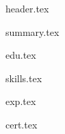 \documentclass[11pt, a4paper]{extarticle}
\begin{document}
	{header.tex}

	{summary.tex}

	{edu.tex}

	{skills.tex}

	{exp.tex}

	{cert.tex}

	\seenextpage
\end{document}
